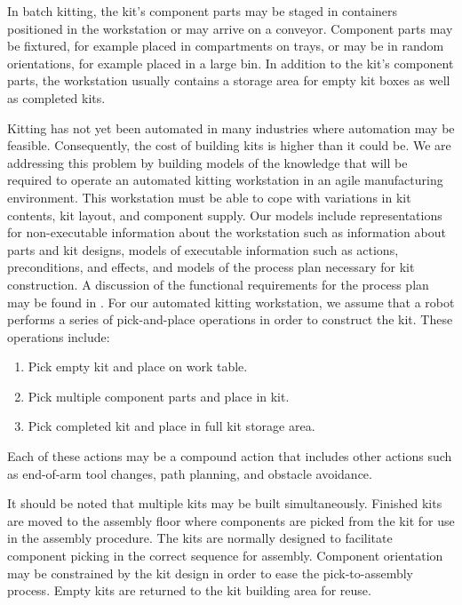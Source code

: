 In batch kitting, the kit's component parts may be staged in containers positioned in the workstation or may arrive on a conveyor.
Component parts may be fixtured, for example placed in compartments on trays, or may be in random orientations, for example
placed in a large bin. In addition to the kit's component parts, the workstation usually contains a storage area for empty kit boxes as
well as completed kits.

Kitting has not yet been automated in many industries where automation may be feasible. Consequently, the cost of building kits is higher than it could be. We are addressing this problem by building models of the knowledge that will be required to operate an automated kitting workstation in an agile manufacturing environment. This workstation must be able to cope with
variations in kit contents, kit layout, and component supply. Our models
include representations for non-executable information about the workstation such as information about parts and kit designs, models of executable information such as actions, preconditions, and effects, and models of the  process plan
necessary for kit construction. A discussion of the functional requirements for the process plan may be found in \cite{Balakirsky2012_1}.
For our automated kitting workstation, we assume that a robot performs a series of pick-and-place operations
in order to construct the kit. These operations include:
\begin{enumerate}
\item Pick empty kit and place on work table.
\item Pick multiple component parts and place in kit.
\item Pick completed kit and place in full kit storage area.
\end{enumerate}
Each of these actions may be a compound action that includes other actions such as end-of-arm tool changes, path planning,
and obstacle avoidance.

It should be noted that multiple kits may be built simultaneously. Finished kits are moved to the assembly floor where components
are picked
from the kit for use in the assembly procedure. The kits are normally designed to facilitate component picking in the correct
sequence for assembly. Component orientation may be constrained by the kit design in order to ease the pick-to-assembly process.
Empty kits are returned to the kit building area for reuse.

